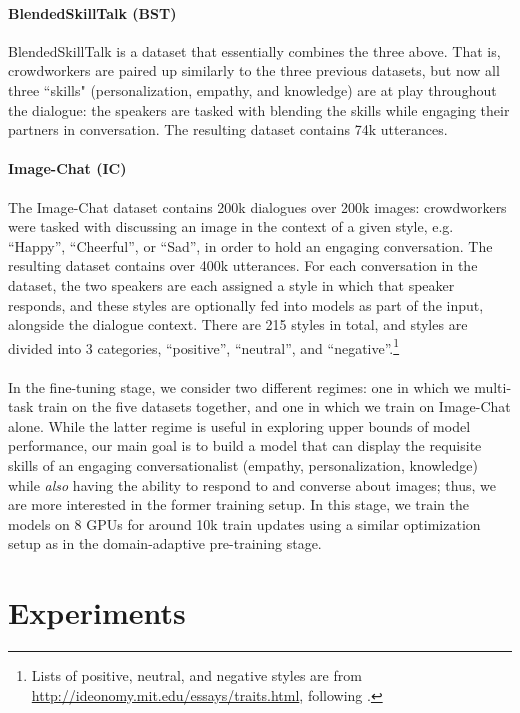 \documentclass[11pt,a4paper]{article}
\begin{document}
\paragraph{BlendedSkillTalk (BST)} BlendedSkillTalk \cite{smith2020bst} is a dataset that essentially combines the three above. That is, crowdworkers are paired up similarly to the three previous datasets, but now all three ``skills" (personalization, empathy, and knowledge) are at play throughout the dialogue: the speakers are tasked with blending the skills while engaging their partners in conversation. The resulting dataset contains 74k utterances.
\paragraph{Image-Chat (IC)} The Image-Chat dataset \cite{shuster2020image} contains 200k dialogues over 200k images: crowdworkers were tasked with discussing an image in the context of a given style, e.g. ``Happy'', ``Cheerful'', or ``Sad'', in order to hold an engaging conversation. The resulting dataset contains over 400k utterances. For each conversation in the dataset, the two speakers are each assigned a style in which that speaker responds, and these styles are optionally fed into models as part of the input, alongside the dialogue context. There are 215 styles in total, and styles are divided into 3 categories, ``positive'', ``neutral'', and ``negative''.\footnote{Lists of positive, neutral, and negative styles are from \url{http://ideonomy.mit.edu/essays/traits.html}, following \citet{shuster2018imagecaption}.}

\paragraph{} In the fine-tuning stage, we consider two different regimes: one in which we multi-task train on the five datasets together, and one in which we train on Image-Chat alone. While the latter regime is useful in exploring upper bounds of model performance, our main goal is to build a model that can display the requisite skills of an engaging conversationalist (empathy, personalization, knowledge) while \textit{also} having the ability to respond to and converse about images; thus, we are more interested in the former training setup. In this stage, we train the models on 8 GPUs for around 10k train updates using a similar optimization setup as in the domain-adaptive pre-training stage. 

\section{Experiments}
\end{document}
